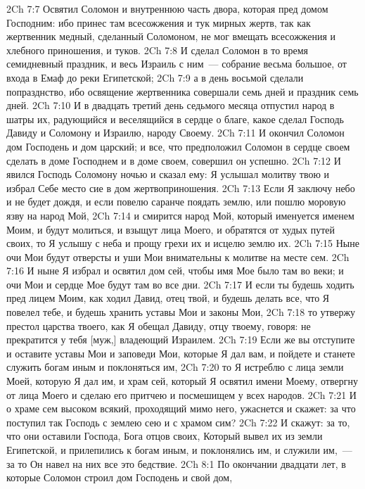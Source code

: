 \vs 2Ch 7:7 Освятил Соломон и внутреннюю часть двора, которая пред домом Господним: ибо принес там всесожжения и тук мирных жертв, так как жертвенник медный, сделанный Соломоном, не мог вмещать всесожжения и хлебного приношения, и туков.
\vs 2Ch 7:8 И сделал Соломон в то время семидневный праздник, и весь Израиль с ним~--- собрание весьма большое,  от входа в Емаф до реки Египетской;
\vs 2Ch 7:9 а в день восьмой сделали попразднство, ибо освящение жертвенника совершали семь дней и праздник семь дней.
\vs 2Ch 7:10 И в двадцать третий день седьмого месяца  отпустил народ в шатры их, радующийся и веселящийся в сердце о благе, какое сделал Господь Давиду и Соломону и Израилю, народу Своему.
\rsbpar\vs 2Ch 7:11 И окончил Соломон дом Господень и дом царский; и все, что предположил Соломон в сердце своем сделать в доме Господнем и в доме своем, совершил он успешно.
\vs 2Ch 7:12 И явился Господь Соломону ночью и сказал ему: Я услышал молитву твою и избрал Себе место сие в дом жертвоприношения.
\vs 2Ch 7:13 Если Я заключу небо и не будет дождя, и если повелю саранче поядать землю, или пошлю моровую язву на народ Мой,
\vs 2Ch 7:14 и смирится народ Мой, который именуется именем Моим, и будут молиться, и взыщут лица Моего, и обратятся от худых путей своих, то Я услышу с неба и прощу грехи их и исцелю землю их.
\vs 2Ch 7:15 Ныне очи Мои будут отверсты и уши Мои внимательны к молитве на месте сем.
\vs 2Ch 7:16 И ныне Я избрал и освятил дом сей, чтобы имя Мое было там во веки; и очи Мои и сердце Мое будут там во все дни.
\vs 2Ch 7:17 И если ты будешь ходить пред лицем Моим, как ходил Давид, отец твой, и будешь делать все, что Я повелел тебе, и будешь хранить уставы Мои и законы Мои,
\vs 2Ch 7:18 то утвержу престол царства твоего, как Я обещал Давиду, отцу твоему, говоря: не прекратится у тебя [муж,] владеющий Израилем.
\vs 2Ch 7:19 Если же вы отступите и оставите уставы Мои и заповеди Мои, которые Я дал вам, и пойдете и станете служить богам иным и поклоняться им,
\vs 2Ch 7:20 то Я истреблю  с лица земли Моей, которую Я дал им, и храм сей, который Я освятил имени Моему, отвергну от лица Моего и сделаю его притчею и посмешищем у всех народов.
\vs 2Ch 7:21 И о храме сем высоком всякий, проходящий мимо него, ужаснется и скажет: за что поступил так Господь с землею сею и с храмом сим?
\vs 2Ch 7:22 И скажут: за то, что они оставили Господа, Бога отцов своих, Который вывел их из земли Египетской, и прилепились к богам иным, и поклонялись им, и служили им,~--- за то Он навел на них все это бедствие.
\vs 2Ch 8:1 По окончании двадцати лет, в которые Соломон строил дом Господень и свой дом,
